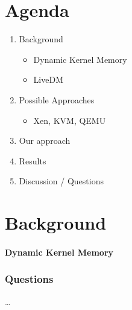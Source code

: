 \documentclass{i20lecture}
\subtitle{LiveDM - Proof of Concept}
\begin{document}
\frame{\titlepage}

\section{Agenda}
\begin{frame}{\insertsection}
  \begin{enumerate}
   \item Background
   \begin{itemize}
    \item Dynamic Kernel Memory
    \item LiveDM
   \end{itemize}
   \item Possible Approaches
   \begin{itemize}
    \item Xen, KVM, QEMU
   \end{itemize}
   \item Our approach
   \item Results
   \item Discussion / Questions
  \end{enumerate}
\end{frame}

\section{Background}
\begin{frame}{\insertsection}
  \framesubtitle{Dynamic Kernel Memory}

\end{frame}

\begin{frame}
  \frametitle{Questions}
  \begin{center}
    \LARGE \dots
  \end{center}
\end{frame}
\end{document}
